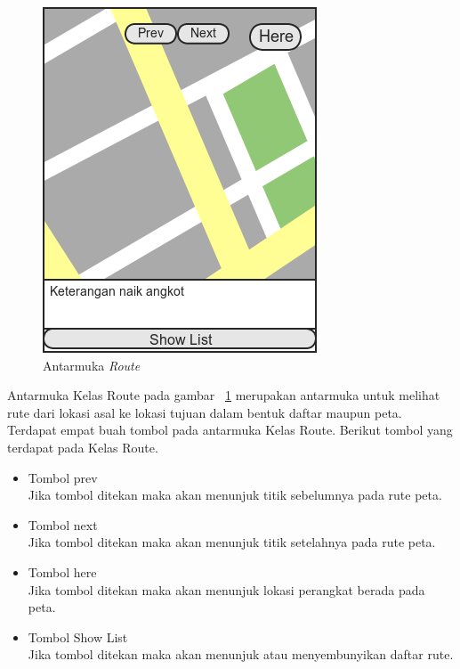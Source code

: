 \begin{figure}[h]
	\centering
		\includegraphics[scale=0.6]{Gambar/perancangan_antarmuka/Route}
	\caption{Antarmuka \textit{Route}}
	\label{fig:Antarmuka Route}
\end{figure}

\hspace{0.5cm} Antarmuka Kelas Route pada gambar ~\ref{fig:Antarmuka Route} merupakan antarmuka untuk melihat rute dari lokasi asal ke lokasi tujuan dalam bentuk daftar maupun peta. Terdapat empat buah tombol pada antarmuka Kelas Route. Berikut tombol yang terdapat pada Kelas Route. 
\begin{itemize}
	\item Tombol prev\\
	Jika tombol ditekan maka akan menunjuk titik sebelumnya pada rute peta.
	\item Tombol next\\
	Jika tombol ditekan maka akan menunjuk titik setelahnya pada rute peta.
	\item Tombol here\\
	Jika tombol ditekan maka akan menunjuk lokasi perangkat berada pada peta.
	\item Tombol Show List\\
	Jika tombol ditekan maka akan menunjuk atau menyembunyikan daftar rute.
\end{itemize}

